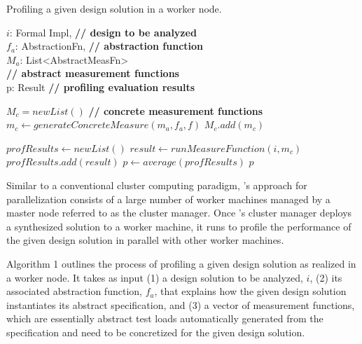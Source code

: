 \documentclass[10pt,conference]{IEEEtran}
\begin{document}
\begin{algorithm}[tb]
\caption{Profiling a given design solution in a worker node.} %
\label{alg:para_eval}
\begin{algorithmic}[1]
\REQUIRE $i$: Formal Impl, \textcolor{comments}{\textbf{// design to be analyzed}} \\
 		 $f_a$: AbstractionFn, \textcolor{comments}{\textbf{// abstraction function}} \\
		$M_a$: List<AbstractMeasFn> \\\textcolor{comments}{\textbf{// abstract measurement functions}} \\ 
\ENSURE p: Result \textcolor{comments}{\textbf{// profiling evaluation results}}

\STATE $M_c = new List()$ \textcolor{comments}{\textbf{// concrete measurement functions}} \\ 
	\STATE $m_c \gets generateConcreteMeasure(m_a, f_a, f)$
	\STATE $M_c.add(m_c)$
\ENDFOR

\STATE $profResults \gets new List()$
		\STATE $result \gets runMeasureFunction(i, m_c)$
		\STATE $profResults.add(result)$
	\ENDFOR
\ENDFOR
\STATE $p \gets average(profResults)$
\RETURN $p$
\end{algorithmic}
\end{algorithm}

Similar to a conventional cluster computing paradigm, \@approach's approach for parallelization  consists of a large number of worker machines managed by a master node referred to as the cluster manager.
Once \@approach's cluster manager deploys a synthesized solution to a worker machine,
it runs to profile the performance of the given design solution in parallel with other worker machines.

Algorithm 1 outlines the process of profiling a given design solution as realized in a worker node. 
It takes as input (1) a design solution to be analyzed, $i$, (2) its associated abstraction function, $f_a$, that explains how the given design solution instantiates its abstract specification, and (3) a vector of measurement functions, which are essentially abstract test loads automatically generated from the specification and need to be concretized for the given design solution. 
\end{document}
